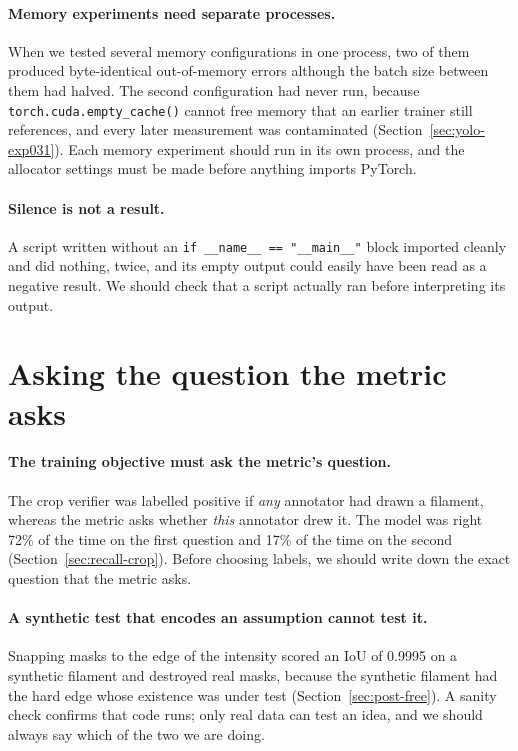 \paragraph{Memory experiments need separate processes.} When we tested several memory configurations in
one process, two of them produced byte-identical out-of-memory errors although the batch size between
them had halved. The second configuration had never run, because \texttt{torch.cuda.empty\_cache()}
cannot free memory that an earlier trainer still references, and every later measurement was
contaminated (Section~\ref{sec:yolo-exp031}). Each memory experiment should run in its own process, and
the allocator settings must be made before anything imports PyTorch.

\paragraph{Silence is not a result.} A script written without an
\texttt{if \_\_name\_\_ == "\_\_main\_\_"} block imported cleanly and did nothing, twice, and its
empty output could easily have been read as a negative result. We should check that a script actually
ran before interpreting its output.

\section{Asking the question the metric asks}\label{sec:lessons-question}

\paragraph{The training objective must ask the metric's question.} The crop verifier was labelled
positive if \emph{any} annotator had drawn a filament, whereas the metric asks whether \emph{this}
annotator drew it. The model was right 72\% of the time on the first question and 17\% of the time on
the second (Section~\ref{sec:recall-crop}). Before choosing labels, we should write down the exact
question that the metric asks.

\paragraph{A synthetic test that encodes an assumption cannot test it.} Snapping masks to the edge of
the intensity scored an IoU of 0.9995 on a synthetic filament and destroyed real masks, because the
synthetic filament had the hard edge whose existence was under test (Section~\ref{sec:post-free}). A
sanity check confirms that code runs; only real data can test an idea, and we should always say which of
the two we are doing.

